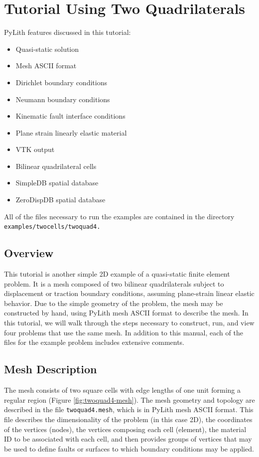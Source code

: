 
\section{\label{sec:Tutorial-Two-quad4}Tutorial Using Two Quadrilaterals}

PyLith features discussed in this tutorial:
\begin{itemize}
\item Quasi-static solution
\item Mesh ASCII format
\item Dirichlet boundary conditions
\item Neumann boundary conditions
\item Kinematic fault interface conditions
\item Plane strain linearly elastic material
\item VTK output
\item Bilinear quadrilateral cells
\item SimpleDB spatial database
\item ZeroDispDB spatial database
\end{itemize}
All of the files necessary to run the examples are contained in the
directory \texttt{examples/twocells/twoquad4.}


\subsection{Overview}

This tutorial is another simple 2D example of a quasi-static finite
element problem. It is a mesh composed of two bilinear quadrilaterals
subject to displacement or traction boundary conditions, assuming
plane-strain linear elastic behavior. Due to the simple geometry of
the problem, the mesh may be constructed by hand, using PyLith mesh
ASCII format to describe the mesh. In this tutorial, we will walk
through the steps necessary to construct, run, and view four problems
that use the same mesh. In addition to this manual, each of the files
for the example problem includes extensive comments.


\subsection{Mesh Description}

The mesh consists of two square cells with edge lengths of one unit
forming a regular region (Figure \vref{fig:twoquad4-mesh}). The mesh
geometry and topology are described in the file \texttt{twoquad4.mesh},
which is in PyLith mesh ASCII format. This file describes the dimensionality
of the problem (in this case 2D), the coordinates of the vertices
(nodes), the vertices composing each cell (element), the material
ID to be associated with each cell, and then provides groups of vertices
that may be used to define faults or surfaces to which boundary conditions
may be applied.

